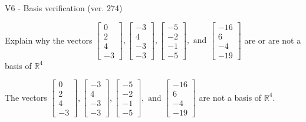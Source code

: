 \begin{exercise}
  \begin{exerciseTitle}V6 - Basis verification (ver. 274)\end{exerciseTitle}
  \begin{exerciseStatement}
    Explain why the vectors \(\left[\begin{array}{r}
0 \\
2 \\
4 \\
-3
\end{array}\right] , \left[\begin{array}{r}
-3 \\
4 \\
-3 \\
-3
\end{array}\right] , \left[\begin{array}{r}
-5 \\
-2 \\
-1 \\
-5
\end{array}\right] , \text{ and } \left[\begin{array}{r}
-16 \\
6 \\
-4 \\
-19
\end{array}\right]\) are or are not a basis of \(\mathbb{R}^4\)	


  \end{exerciseStatement}
  \begin{exerciseAnswer}
   The vectors \(\left[\begin{array}{r}
0 \\
2 \\
4 \\
-3
\end{array}\right] , \left[\begin{array}{r}
-3 \\
4 \\
-3 \\
-3
\end{array}\right] , \left[\begin{array}{r}
-5 \\
-2 \\
-1 \\
-5
\end{array}\right] , \text{ and } \left[\begin{array}{r}
-16 \\
6 \\
-4 \\
-19
\end{array}\right]\) 
  	 are not  a basis of \(\mathbb{R}^4\).
  


  \end{exerciseAnswer}
\end{exercise}